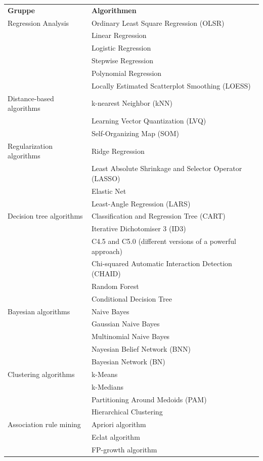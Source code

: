 \begin{table}[H]
\tiny
\begin{tabular}{|l|l|}
\hline
\textbf{Gruppe} & \textbf{Algorithmen}\\ 
\hhline{==}
Regression Analysis & Ordinary Least Square Regression (OLSR)\\
& Linear Regression\\
& Logistic Regression\\
& Stepwise Regression\\
& Polynomial Regression\\
& Locally Estimated Scatterplot Smoothing (LOESS)\\
\hline
Distance-based algorithms & k-nearest Neighbor (kNN)\\
& Learning Vector Quantization (LVQ)\\
& Self-Organizing Map (SOM)\\
\hline
Regularization algorithms & Ridge Regression\\
& Least Absolute Shrinkage and Selector Operator (LASSO)\\
& Elastic Net\\
& Least-Angle Regression (LARS)\\
\hline
Decision tree algorithms & Classification and Regression Tree (CART)\\
& Iterative Dichotomiser 3 (ID3)\\
& C4.5 and C5.0 (different versions of a powerful approach)\\
& Chi-squared Automatic Interaction Detection (CHAID)\\
& Random Forest\\
& Conditional Decision Tree\\
\hline
Bayesian algorithms & Naive Bayes\\
& Gaussian Naive Bayes\\
& Multinomial Naive Bayes\\
& Nayesian Belief Network (BNN)\\
& Bayesian Network (BN)\\
\hline
Clustering algorithms & k-Means\\
& k-Medians\\
& Partitioning Around Medoids (PAM)\\
& Hierarchical Clustering\\
\hline
Association rule mining & Apriori algorithm\\
& Eclat algorithm\\
& FP-growth algorithm\\

\end{tabular}
\end{table}
